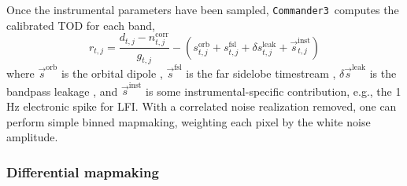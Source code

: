 \documentclass[twocolumn]{../../common/aa}
\def\commanderthree{\texttt{Commander3}}
\newcommand{\s}[0]{\vec{s}}
\begin{document}
Once the instrumental parameters have been sampled, \commanderthree\ computes the calibrated TOD for each band,
\begin{equation}
	r_{t,j}=\frac{d_{t,j}-n_{t,j}^\mathrm{corr}}{g_{t,j}}-\left(s_{t,j}^\mathrm{orb}
	+s_{t,j}^\mathrm{fsl}+\delta s_{t,j}^\mathrm{leak}+\vec{s}_{t,j}^\mathrm{inst}\right)
\end{equation}
where $\s^\mathrm{orb}$ is the orbital dipole \citep{bp07}, $\s^\mathrm{fsl}$ is the far sidelobe timestream \citep{bp08}, $\delta\s^\mathrm{leak}$ is the bandpass leakage \citep{bp09}, and $\s^\mathrm{inst}$ is some instrumental-specific contribution, e.g., the 1\,Hz electronic spike for LFI. With a correlated noise realization removed, one can perform simple binned mapmaking, weighting each pixel by the white noise amplitude.





\subsubsection{Differential mapmaking}
\label{ssec:mapmaking}
\end{document}
